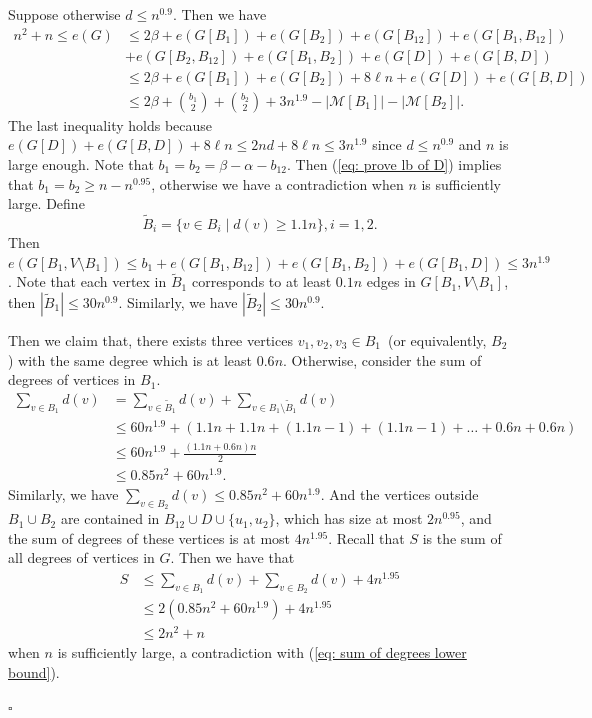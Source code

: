\documentclass[12pt]{article}%
\newenvironment{proof}{{\noindent\it Proof.}}{\hfill $\square$\par}
\begin{document}
\begin{proof}
	Suppose otherwise $d \le  n^{0.9}$.
	Then we have
	\begin{equation}\label{eq: prove lb of D}
	\begin{aligned}
		n^2 + n \le e(G) &\le 2\beta + e(G[B_1]) + e(G[B_2]) + e(G[B_{12}])
		+ e(G[B_1,B_{12}])\\
		 &+ e(G[B_2,B_{12}]) + e(G[B_1,B_2]) + e(G[D]) + e(G[B,D]) \\
		 &\leq 2\beta + e(G[B_1]) + e(G[B_2]) + 8\ell n + e(G[D]) + e(G[B,D])\\
		&\le 2\beta + \binom{b_1}{2}+\binom{b_2}{2} + 3n^{1.9} - |\mathcal{M}[B_1]| - |\mathcal{M}[B_2]|.
	\end{aligned}
	\end{equation}
The last inequality holds because $e(G[D])+e(G[B,D])+8\ell n\le 2nd+8\ell n\le 3n^{1.9}$ since $d\le n^{0.9}$ and $n$ is large enough.
Note that $b_1=b_2=\beta -\alpha -b_{12}$. Then (\ref{eq: prove lb of D}) implies that $b_1 = b_2 \ge n-n^{0.95}$, otherwise we have a contradiction when $n$ is sufficiently large.
Define
$$\tilde{B}_i = \{v \in B_i \mid d(v) \ge 1.1n\}, i=1,2.$$
Then $e(G[B_1,V\setminus B_{1}]) \le b_1 + e(G[B_1,B_{12}]) + e(G[B_1,B_2]) + e(G[B_1,D]) \le 3n^{1.9}$.
Note that each vertex in $\tilde{B}_1$ corresponds to at least $0.1n$ edges in $G[B_1,V\setminus B_{1}]$, then $|\tilde{B}_1| \le 30n^{0.9}$.
Similarly, we have $|\tilde{B}_2| \le 30n^{0.9}$.

	Then we claim that, there exists three vertices $v_1, v_2, v_3 \in B_1$~(or equivalently, $B_2$) with the same degree which is at least $0.6n$.
	Otherwise, consider the sum of degrees of vertices in $B_1$.
	\begin{equation*}
	\begin{aligned}
		\sum_{v \in B_1} d(v) & = \sum_{v \in \tilde{B}_1} d(v) + \sum_{v \in B_1 \setminus \tilde{B}_1} d(v) \\
		& \le 60n^{1.9} + \left(1.1n + 1.1n + (1.1n-1) +(1.1n-1) + \ldots + 0.6n +  0.6n\right) \\
		& \le 60n^{1.9} + \frac{(1.1n + 0.6n)n}{2}\\
		& \le 0.85n^2 + 60n^{1.9}.
	\end{aligned}
	\end{equation*}
	Similarly, we have $\sum_{v \in B_2} d(v)\le 0.85n^2 + 60n^{1.9}.$ And the vertices outside $B_1\cup B_2$ are contained in $B_{12}\cup D\cup \{u_1,u_2\}$, which has size at most $2n^{0.95}$, and the sum of degrees of these vertices is at most $4n^{1.95}$.
	Recall that $S$ is the sum of all degrees of vertices in $G$. Then we have that
	\begin{equation*}
	\begin{aligned}
		S & \le \sum_{v \in B_1} d(v) + \sum_{v \in B_2} d(v) + 4n^{1.95}\\
		&\le 2(0.85n^2 + 60n^{1.9}) + 4n^{1.95}\\
		&\le 2n^2 + n
	\end{aligned}
	\end{equation*}
	when $n$ is sufficiently large, a contradiction with (\ref{eq: sum of degrees lower bound}).


\end{proof}
\end{document}
